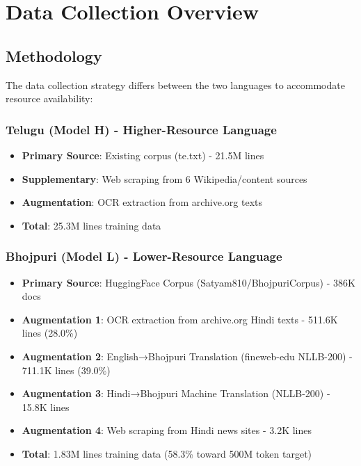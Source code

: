 \documentclass[11pt,a4paper]{article}
\begin{document}
\section{Data Collection Overview}

\subsection{Methodology}

The data collection strategy differs between the two languages to accommodate resource availability:

\subsubsection{Telugu (Model H) - Higher-Resource Language}

\begin{itemize}
    \item \textbf{Primary Source}: Existing corpus (te.txt) - 21.5M lines
    \item \textbf{Supplementary}: Web scraping from 6 Wikipedia/content sources
    \item \textbf{Augmentation}: OCR extraction from archive.org texts
    \item \textbf{Total}: 25.3M lines training data
\end{itemize}

\subsubsection{Bhojpuri (Model L) - Lower-Resource Language}

\begin{itemize}
    \item \textbf{Primary Source}: HuggingFace Corpus (Satyam810/BhojpuriCorpus) - 386K docs
    \item \textbf{Augmentation 1}: OCR extraction from archive.org Hindi texts - 511.6K lines (28.0\%)
    \item \textbf{Augmentation 2}: English→Bhojpuri Translation (fineweb-edu NLLB-200) - 711.1K lines (39.0\%)
    \item \textbf{Augmentation 3}: Hindi→Bhojpuri Machine Translation (NLLB-200) - 15.8K lines
    \item \textbf{Augmentation 4}: Web scraping from Hindi news sites - 3.2K lines
    \item \textbf{Total}: 1.83M lines training data (58.3\% toward 500M token target)
\end{itemize}
\end{document}

